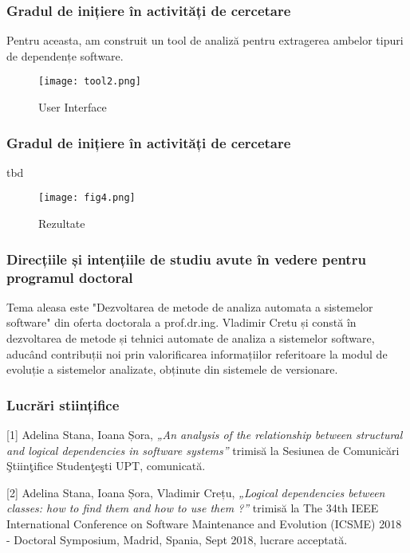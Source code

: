 \documentclass{beamer}
\begin{document}

 \begin{frame}
\frametitle{Gradul de inițiere în activități de cercetare }
Pentru aceasta, am construit un tool de analiză pentru extragerea ambelor tipuri de dependențe software. 
\begin{center}
     \begin{figure}
	\texttt{[image: tool2.png]}
	\caption{\label{fig:figtool} User Interface}
     \end{figure}
\end{center}

\end{frame}


 \begin{frame}
\frametitle{Gradul de inițiere în activități de cercetare}
tbd
\begin{center}
     \begin{figure}
	\texttt{[image: fig4.png]}
	\caption{\label{fig:figtool} Rezultate}
     \end{figure}
\end{center}

\end{frame}

 \begin{frame}
\frametitle{Direcțiile și intențiile de studiu avute în vedere pentru programul doctoral}
Tema aleasa este "Dezvoltarea de metode de analiza automata a sistemelor software" din oferta doctorala a prof.dr.ing. Vladimir Cretu și constă în dezvoltarea de metode și tehnici automate de analiza a sistemelor software, aducând contribuții noi prin valorificarea informațiilor referitoare la modul de evoluție a sistemelor analizate, obținute din sistemele de versionare. 

\end{frame}


 \begin{frame}
\frametitle{Lucrări stiințifice}
[1] Adelina Stana, Ioana Șora, \textit{„An analysis of the relationship between structural and logical dependencies in software systems”} trimisă la Sesiunea de Comunicări Ştiinţifice Studenţeşti UPT, comunicată.


[2] Adelina Stana, Ioana Șora, Vladimir Crețu, \textit{„Logical dependencies between classes: how to find them and how to use them ?”} trimisă la The 34th IEEE International Conference on Software Maintenance and Evolution (ICSME) 2018 - Doctoral Symposium, Madrid, Spania, Sept 2018, lucrare acceptată.
\end{frame}
\end{document}
